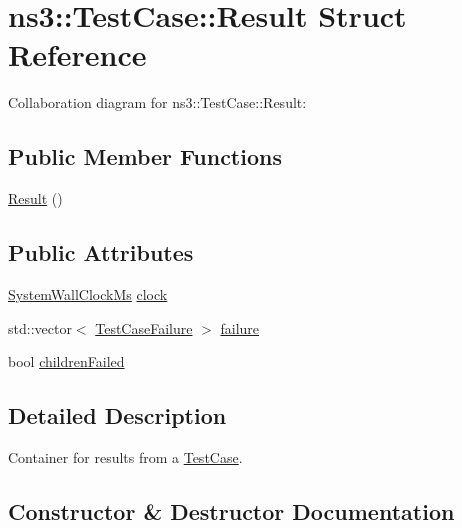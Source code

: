 \hypertarget{structns3_1_1TestCase_1_1Result}{}\section{ns3\+:\+:Test\+Case\+:\+:Result Struct Reference}
\label{structns3_1_1TestCase_1_1Result}


Collaboration diagram for ns3\+:\+:Test\+Case\+:\+:Result\+:
\subsection*{Public Member Functions}
\begin{DoxyCompactItemize}
\item 
\hyperlink{structns3_1_1TestCase_1_1Result_a0d94e3d7e9b9d2cf0f7b9c4a4d6edd9e}{Result} ()
\end{DoxyCompactItemize}
\subsection*{Public Attributes}
\begin{DoxyCompactItemize}
\item 
\hyperlink{classns3_1_1SystemWallClockMs}{System\+Wall\+Clock\+Ms} \hyperlink{structns3_1_1TestCase_1_1Result_afafbb7b83180b9688a5acc6784b3e234}{clock}
\item 
std\+::vector$<$ \hyperlink{structns3_1_1TestCaseFailure}{Test\+Case\+Failure} $>$ \hyperlink{structns3_1_1TestCase_1_1Result_a2786d592a2966465ad4a5cc623447903}{failure}
\item 
bool \hyperlink{structns3_1_1TestCase_1_1Result_a587df44d5bdc9d91b9f418dbd5896d4f}{children\+Failed}
\end{DoxyCompactItemize}


\subsection{Detailed Description}
Container for results from a \hyperlink{classns3_1_1TestCase}{Test\+Case}. 

\subsection{Constructor \& Destructor Documentation}
